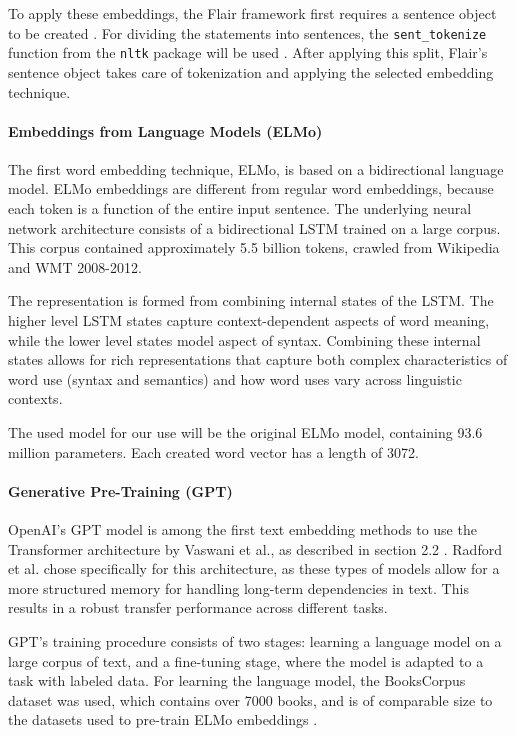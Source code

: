 To apply these embeddings, the Flair framework first requires a sentence object to be created \cite{flairsentence}.
For dividing the statements into sentences, the \texttt{sent\_tokenize} function from the \texttt{nltk} package will be used \cite{nltktokenize}. 
After applying this split, Flair's sentence object takes care of tokenization and applying the selected embedding technique.

\paragraph{Embeddings from Language Models (ELMo)}
The first word embedding technique, ELMo, is based on a bidirectional language model. 
ELMo embeddings are different from regular word embeddings, because each token is a function of the entire input sentence.
The underlying neural network architecture consists of a bidirectional LSTM trained on a large corpus.
This corpus contained approximately 5.5 billion tokens, crawled from Wikipedia and WMT 2008-2012.

The representation is formed from combining internal states of the LSTM. 
The higher level LSTM states capture context-dependent aspects of word meaning, while the lower level states model aspect of syntax.
Combining these internal states allows for rich representations that capture both complex characteristics of word use (syntax and semantics) and how word uses vary across linguistic contexts\cite{peters2018}.

The used model for our use will be the original ELMo model, containing 93.6 million parameters.
Each created word vector has a length of 3072. 

\paragraph{Generative Pre-Training (GPT)}
OpenAI's GPT model is among the first text embedding methods to use the Transformer architecture by Vaswani et al., as described in section 2.2 \cite{vaswani2017}.
Radford et al. chose specifically for this architecture, as these types of models allow for a more structured memory for handling long-term dependencies in text.
This results in a robust transfer performance across different tasks. 

GPT's training procedure consists of two stages: learning a language model on a large corpus of text, and a fine-tuning stage, where the model is adapted to a task with labeled data.
For learning the language model, the BooksCorpus dataset was used, which contains over 7000 books, and is of comparable size to the datasets used to pre-train ELMo embeddings \cite{radford2018}.

